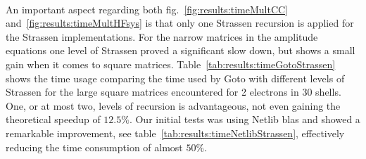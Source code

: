 \paragraph{}
An important aspect regarding both fig.~\ref{fig:results:timeMultCC} and~\ref{fig:results:timeMultHFsys} is that only one Strassen recursion is applied for the Strassen implementations.
For the narrow matrices in the amplitude equations one level of Strassen proved a significant slow down, but shows a small gain when it comes to square matrices.
Table~\ref{tab:results:timeGotoStrassen} shows the time usage comparing the time used by Goto with different levels of Strassen for the large square matrices encountered for 2 electrons in 30 shells.
One, or at most two, levels of recursion is advantageous, not even gaining the theoretical speedup of $12.5\%$.
Our initial tests was using Netlib blas and showed a remarkable improvement, see table~\ref{tab:results:timeNetlibStrassen}, effectively reducing the time consumption of almost $50\%$.
\begin{table}
\begin{center}
\caption{Time used by Goto's and Netlib's blas multiplying two square matrices, for different levels of Strassen splitting.}
\hspace{20mm}
\end{center}
\end{table}




